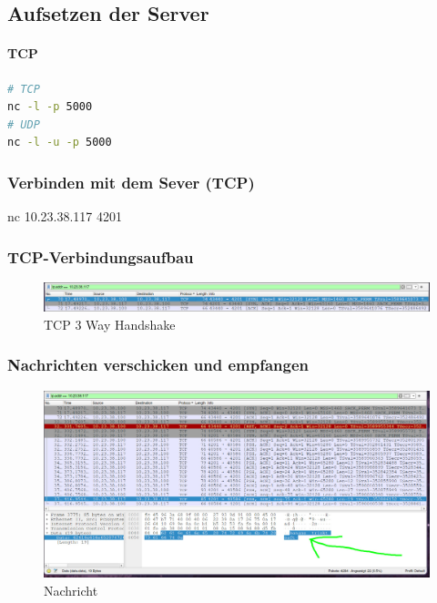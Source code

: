 \documentclass[a4paper]{article}
\begin{document}
\subsection{Aufsetzen der Server}
\paragraph{TCP}
\begin{lstlisting}[language=bash,caption={Commands}]
# TCP
nc -l -p 5000
# UDP
nc -l -u -p 5000
\end{lstlisting}

\subsubsection{Verbinden mit dem Sever (TCP)}
nc 10.23.38.117 4201
\subsubsection{TCP-Verbindungsaufbau}
\begin{figure}[h]
	\includegraphics[scale=0.3]{images/handshake.jpeg}
	\caption{TCP 3 Way Handshake}
\end{figure}
\subsubsection{Nachrichten verschicken und empfangen}
\begin{figure}[h]
	\includegraphics[scale=0.3]{images/nachricht.jpeg}
	\caption{Nachricht}
\end{figure}
\newpage
\end{document}
